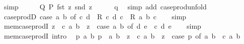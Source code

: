 \begin{isabellebody}
\ simp\isanewline
\ \ \isamarkupfalse%
\ \isamarkupfalse%
\ {\isachardoublequoteopen}Q\ {\isacharparenleft}{\kern0pt}P\ {\isacharparenleft}{\kern0pt}fst\ z{\isacharparenright}{\kern0pt}\ {\isacharparenleft}{\kern0pt}snd\ z{\isacharparenright}{\kern0pt}{\isacharparenright}{\kern0pt}{\isachardoublequoteclose}\isanewline
\ \ \ \ \isamarkupfalse%
\ q\ \isamarkupfalse%
\ {\isacharparenleft}{\kern0pt}simp\ add{\isacharcolon}{\kern0pt}\ case{\isacharunderscore}{\kern0pt}prod{\isacharunderscore}{\kern0pt}unfold{\isacharparenright}{\kern0pt}\isanewline
{}\isamarkupfalse%
%
\endisatagproof
{\isafoldproof}%
%
\isadelimproof
\isanewline
%
\endisadelimproof
\isanewline
{}\isamarkupfalse%
\ case{\isacharunderscore}{\kern0pt}prodD{\isacharprime}{\kern0pt}{\isacharcolon}{\kern0pt}\ {\isachardoublequoteopen}{\isacharparenleft}{\kern0pt}case\ {\isacharparenleft}{\kern0pt}a{\isacharcomma}{\kern0pt}\ b{\isacharparenright}{\kern0pt}\ of\ {\isacharparenleft}{\kern0pt}c{\isacharcomma}{\kern0pt}\ d{\isacharparenright}{\kern0pt}\ {\isasymRightarrow}\ R\ c\ d{\isacharparenright}{\kern0pt}\ c\ {\isasymLongrightarrow}\ R\ a\ b\ c{\isachardoublequoteclose}\isanewline
%
\isadelimproof
\ \ %
\endisadelimproof
%
\isatagproof
{}\isamarkupfalse%
\ simp%
\endisatagproof
{\isafoldproof}%
%
\isadelimproof
\isanewline
%
\endisadelimproof
\isanewline
{}\isamarkupfalse%
\ mem{\isacharunderscore}{\kern0pt}case{\isacharunderscore}{\kern0pt}prodI{\isacharcolon}{\kern0pt}\ {\isachardoublequoteopen}z\ {\isasymin}\ c\ a\ b\ {\isasymLongrightarrow}\ z\ {\isasymin}\ {\isacharparenleft}{\kern0pt}case\ {\isacharparenleft}{\kern0pt}a{\isacharcomma}{\kern0pt}\ b{\isacharparenright}{\kern0pt}\ of\ {\isacharparenleft}{\kern0pt}d{\isacharcomma}{\kern0pt}\ e{\isacharparenright}{\kern0pt}\ {\isasymRightarrow}\ c\ d\ e{\isacharparenright}{\kern0pt}{\isachardoublequoteclose}\isanewline
%
\isadelimproof
\ \ %
\endisadelimproof
%
\isatagproof
{}\isamarkupfalse%
\ simp%
\endisatagproof
{\isafoldproof}%
%
\isadelimproof
\isanewline
%
\endisadelimproof
\isanewline
{}\isamarkupfalse%
\ mem{\isacharunderscore}{\kern0pt}case{\isacharunderscore}{\kern0pt}prodI{}\ {\isacharbrackleft}{\kern0pt}intro{\isacharbang}{\kern0pt}{\isacharbrackright}{\kern0pt}{\isacharcolon}{\kern0pt}\isanewline
\ \ {\isachardoublequoteopen}{\isasymAnd}p{\isachardot}{\kern0pt}\ {\isacharparenleft}{\kern0pt}{\isasymAnd}a\ b{\isachardot}{\kern0pt}\ p\ {\isacharequal}{\kern0pt}\ {\isacharparenleft}{\kern0pt}a{\isacharcomma}{\kern0pt}\ b{\isacharparenright}{\kern0pt}\ {\isasymLongrightarrow}\ z\ {\isasymin}\ c\ a\ b{\isacharparenright}{\kern0pt}\ {\isasymLongrightarrow}\ z\ {\isasymin}\ {\isacharparenleft}{\kern0pt}case\ p\ of\ {\isacharparenleft}{\kern0pt}a{\isacharcomma}{\kern0pt}\ b{\isacharparenright}{\kern0pt}\ {\isasymRightarrow}\ c\ a\ b{\isacharparenright}{\kern0pt}{\isachardoublequoteclose}\isanewline

\end{isabellebody}
